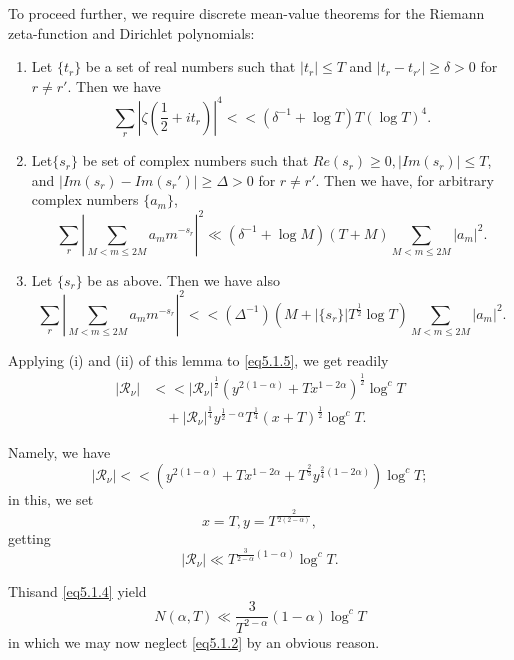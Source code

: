 To proceed further, we require discrete mean-value theorems for the
Riemann zeta-function and Dirichlet polynomials: 

\begin{Lemma}\label{chap5-lem23}%
  \begin{enumerate}[\rm (i)]
  \item Let $\{ t_r \}$ be a set of real numbers such that $ | t_r |
    \leq T$ and $| t_r -t_{r'} | \geq \delta > 0$ for $r \neq r'$. Then
    we have 
    $$
    \sum_r | \zeta \left(\frac{1}{2} + it_r\right) |^4 << (\delta^{-1} +
    \log T) T(\log T)^4. 
    $$
  \item Let\pageoriginale $\{ s_r \}$ be set of complex numbers such
    that $Re(s_r)\geq 0, | Im (s_r) | \leq T$, and $| Im (s_r) - Im
    (s_r') | \geq \Delta > 0$ for $r \neq r'$. Then we have, for
    arbitrary complex numbers $\{a_m\}$, 
    $$
    \sum_r | \sum_{M < m \leq 2M} a_m m^{-s_r} |^2 \ll (\delta^{-1} +
    \log M) (T + M) \sum_{M < m \leq 2M} | a_m |^2. 
    $$

  \item Let $\{ s_r \}$ be as above. Then we have also
    $$
    \sum_r | \sum_{M< m \leq 2M} a_m m ^{-s_r} |^2 << (\Delta^{-1}) (M +
    | \{ s_r \} |T^{\frac{1}{2}} \log T) \sum_{M < m \leq 2M} | a_m
    |^2. 
    $$
  \end{enumerate} 
\end{Lemma}

Applying (i) and (ii) of this lemma to \eqref{eq5.1.5}, we get readily
\begin{align*}
|\mathscr{R}_{\nu}|  &<<  |\mathscr{R}_{\nu} |^{\frac{1}{2}}
\left(y^{2(1-\alpha )} + T x^{1-2 \alpha}\right)^{\frac{1}{2}} \log^c T\\ 
  & \quad  + |\mathscr{R}_{\nu}|^{\frac{1}{4}}y^{\frac{1}{2} -\alpha}
  T^{\frac{1}{4}}(x + T)^{\frac{1}{2}} \log^c T. 
\end{align*}

Namely, we have 
$$
| \mathscr{R}_{\nu} | << \left(y^{2(1 -\alpha)} + Tx^{1-2 \alpha} +
T^{\frac{2}{3}} y^{\frac{2}{4} (1-2 \alpha)}\right) \log^c T; 
$$
in this, we set 
$$
x = T, y = T^{\frac{2}{2 (2- \alpha)}},
$$
getting
$$
| \mathscr{R}_{\nu} | \ll T^{\frac{3}{2- \alpha}(1- \alpha)} \log^cT.
$$

This\pageoriginale and \eqref{eq5.1.4} yield 
\begin{equation*}
  N (\alpha, T ) \ll {\frac{3}{T^{2 - \alpha}}(1- \alpha )} \log^c T
  \tag{5.1.6} \label{eq5.1.6}
\end{equation*}
in which we may now neglect \eqref{eq5.1.2} by an obvious reason.

